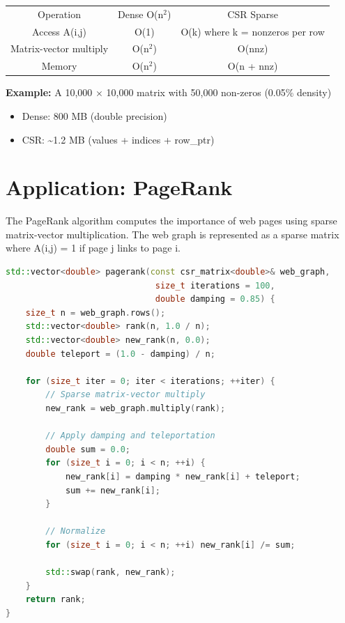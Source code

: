 \begin{center}
\begin{tabular}{ccc}
\toprule
Operation & Dense O(n$^{2}$) & CSR Sparse \\
Access A(i,j) & O(1) & O(k) where k = nonzeros per row \\
Matrix-vector multiply & O(n$^{2}$) & O(nnz) \\
Memory & O(n$^{2}$) & O(n + nnz) \\

\bottomrule
\end{tabular}
\end{center}
\textbf{Example:} A 10,000 $\times $ 10,000 matrix with 50,000 non-zeros (0.05\% density)
\begin{itemize}
\item Dense: 800 MB (double precision)
\item CSR: \textasciitilde{}1.2 MB (values + indices + row\_ptr)
\end{itemize}

\section{Application: PageRank}

The PageRank algorithm computes the importance of web pages using sparse matrix-vector multiplication. The web graph is represented as a sparse matrix where A(i,j) = 1 if page j links to page i.

\begin{lstlisting}[language=C++]
std::vector<double> pagerank(const csr_matrix<double>& web_graph,
                              size_t iterations = 100,
                              double damping = 0.85) {
    size_t n = web_graph.rows();
    std::vector<double> rank(n, 1.0 / n);
    std::vector<double> new_rank(n, 0.0);
    double teleport = (1.0 - damping) / n;

    for (size_t iter = 0; iter < iterations; ++iter) {
        // Sparse matrix-vector multiply
        new_rank = web_graph.multiply(rank);
        
        // Apply damping and teleportation
        double sum = 0.0;
        for (size_t i = 0; i < n; ++i) {
            new_rank[i] = damping * new_rank[i] + teleport;
            sum += new_rank[i];
        }
        
        // Normalize
        for (size_t i = 0; i < n; ++i) new_rank[i] /= sum;
        
        std::swap(rank, new_rank);
    }
    return rank;
}
\end{lstlisting}


